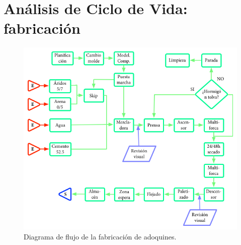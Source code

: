 \chapter{Análisis de Ciclo de Vida: fabricación}

\begin{figure}[!htb]
\centering
\includegraphics[width=15cm]{diagrama.png}
\caption{Diagrama de flujo de la fabricación de adoquines.}
\label{fig:diagrama_de_flujo}
\end{figure}



